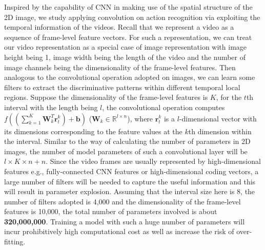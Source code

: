 \documentclass[journal]{IEEEtran}
\begin{document}
Inspired by the capability of CNN in making use of the spatial structure of the 2D image, we study applying convolution on action recognition via exploiting the temporal information of the videos. Recall that we represent a video as a sequence of frame-level feature vectors. For such a representation, we can treat our video representation as a special case of image representation with image height being 1, image width being the length of the video and the number of image channels being the dimensionality of the frame-level features. Then analogous to the convolutional operation adopted on images, we can learn some filters to extract the discriminative patterns within different temporal local regions. Suppose the dimensionality of the frame-level features is $K$, for the $t$th interval with the length being $l$, the convolutional operation computes $f(\left(\sum_{k=1}^K \mathbf{W}_{k}^T\mathbf{r}^{k}_{t}\right)+\mathbf{b})$ ($\mathbf{W}_{k}  \in \mathbb{R}^{l\times{n}} $), where $\mathbf{r}^k_{t}$ is a $l$-dimensional vector with its dimensions corresponding to the feature values at the $k$th dimension within the interval. Similar to the way of calculating the number of parameters in 2D images, the number of model parameters of such a convolutional layer will be $l\times{K}\times{n}+n$. Since the video frames are usually represented by high-dimensional features e.g., fully-connected CNN features or high-dimensional coding vectors, a large number of filters will be needed to capture the useful information and this will result in parameter explosion. Assuming that the interval size here is 8, the number of filters adopted is 4,000 and the dimensionality of the frame-level features is 10,000, the total number of parameters involved is about \textbf{320,000,000}. Training a model with such a huge number of parameters will incur prohibitively high computational cost as well as increase the risk of over-fitting.
\end{document}
